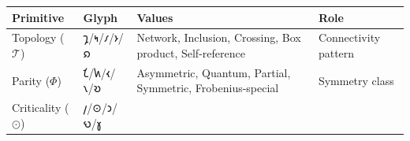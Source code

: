 \begin{longtable}[]{@{}llll@{}}
\toprule
\begin{minipage}[b]{0.30\columnwidth}\raggedright
Primitive\strut
\end{minipage} & \begin{minipage}[b]{0.19\columnwidth}\raggedright
Glyph\strut
\end{minipage} & \begin{minipage}[b]{0.22\columnwidth}\raggedright
Values\strut
\end{minipage} & \begin{minipage}[b]{0.17\columnwidth}\raggedright
Role\strut
\end{minipage}\tabularnewline
\midrule
\endhead
\begin{minipage}[t]{0.30\columnwidth}\raggedright
Topology (\(\mathcal{T}\))\strut
\end{minipage} & \begin{minipage}[t]{0.19\columnwidth}\raggedright
𐑡/𐑰/𐑥/𐑶/𐑸\strut
\end{minipage} & \begin{minipage}[t]{0.22\columnwidth}\raggedright
Network, Inclusion, Crossing, Box product, Self-reference\strut
\end{minipage} & \begin{minipage}[t]{0.17\columnwidth}\raggedright
Connectivity pattern\strut
\end{minipage}\tabularnewline
\begin{minipage}[t]{0.30\columnwidth}\raggedright
Parity (\(\Phi\))\strut
\end{minipage} & \begin{minipage}[t]{0.19\columnwidth}\raggedright
𐑗/𐑿/𐑬/𐑯/𐑹\strut
\end{minipage} & \begin{minipage}[t]{0.22\columnwidth}\raggedright
Asymmetric, Quantum, Partial, Symmetric, Frobenius-special\strut
\end{minipage} & \begin{minipage}[t]{0.17\columnwidth}\raggedright
Symmetry class\strut
\end{minipage}\tabularnewline
\begin{minipage}[t]{0.30\columnwidth}\raggedright
Criticality (\(\odot\))\strut
\end{minipage} & \begin{minipage}[t]{0.19\columnwidth}\raggedright
𐑢/⊙/𐑮/𐑻/𐑣\strut
\end{minipage} & \begin{minipage}[t]{0.22\columnwidth}\raggedright

\end{minipage}
\end{longtable}
